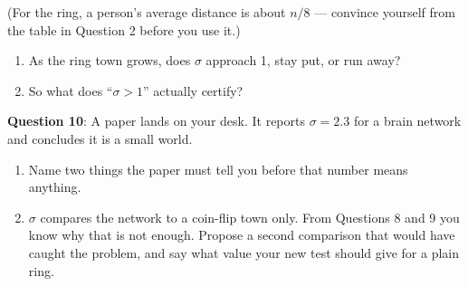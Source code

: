 \documentclass[a4paper, 14pt]{extarticle}
\begin{document}
(For the ring, a person's average distance is about $n/8$ --- convince yourself
from the table in Question 2 before you use it.)

\begin{enumerate}
    \item As the ring town grows, does $\sigma$ approach 1, stay put, or run
          away? \underline{\hspace{3cm}}
    \item So what does ``$\sigma > 1$'' actually certify?

          \underline{\hspace{\textwidth}}
\end{enumerate}

{\bf Question 10}:
A paper lands on your desk. It reports $\sigma = 2.3$ for a brain network and
concludes it is a small world.

\begin{enumerate}
    \item Name two things the paper must tell you before that number means
          anything.

          \underline{\hspace{\textwidth}}

    \item $\sigma$ compares the network to a coin-flip town only. From
          Questions 8 and 9 you know why that is not enough. Propose a second
          comparison that would have caught the problem, and say what value
          your new test should give for a plain ring.

          \underline{\hspace{\textwidth}}

          \underline{\hspace{\textwidth}}
\end{enumerate}
\end{document}
